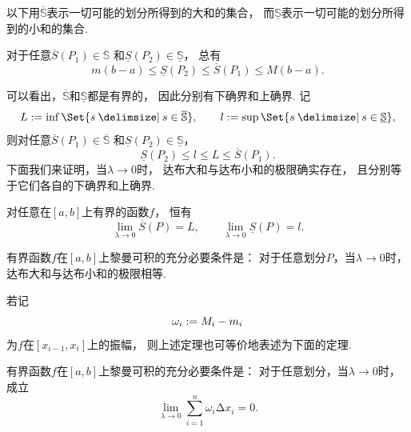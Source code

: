 以下用\(\overline{\mathbb{S}}\)表示一切可能的划分所得到的大和的集合，
而\(\underline{\mathbb{S}}\)表示一切可能的划分所得到的小和的集合.
\begin{lemma}
对于任意\(\overline{S}(P_1) \in \overline{\mathbb{S}}\)
和\(\underline{S}(P_2) \in \underline{\mathbb{S}}\)，
总有\begin{equation*}
	m(b-a)
	\leq \underline{S}(P_2)
	\leq \overline{S}(P_1)
	\leq M(b-a).
\end{equation*}
\end{lemma}
可以看出，\(\overline{\mathbb{S}}\)和\(\underline{\mathbb{S}}\)都是有界的，
因此分别有下确界和上确界.
记\begin{equation*}
	L \defeq \inf\Set{ s \given s \in \overline{\mathbb{S}} }, \qquad
	l \defeq \sup\Set{ s \given s \in \underline{\mathbb{S}} },
\end{equation*}
则对任意\(\overline{S}(P_1) \in \overline{\mathbb{S}}\)
和\(\underline{S}(P_2) \in \underline{\mathbb{S}}\)，\begin{equation*}
	\underline{S}(P_2)
	\leq l \leq L
	\leq \overline{S}(P_1).
\end{equation*}
下面我们来证明，当\(\lambda\to0\)时，
达布大和与达布小和的极限确实存在，
且分别等于它们各自的下确界和上确界.
\begin{lemma}
对任意在\([a,b]\)上有界的函数\(f\)，
恒有\begin{equation*}
	\lim_{\lambda\to0} \overline{S}(P) = L, \qquad
	\lim_{\lambda\to0} \underline{S}(P) = l.
\end{equation*}
\end{lemma}

\begin{theorem}
有界函数\(f\)在\([a,b]\)上黎曼可积的充分必要条件是：
对于任意划分\(P\)，当\(\lambda\to0\)时，
达布大和与达布小和的极限相等.
\end{theorem}

若记\begin{equation*}
	\omega_i := M_i - m_i
\end{equation*}为\(f\)在\([x_{i-1},x_i]\)上的振幅，
则上述定理也可等价地表述为下面的定理.

\begin{theorem}
有界函数\(f\)在\([a,b]\)上黎曼可积的充分必要条件是：
对于任意划分，当\(\lambda\to0\)时，
成立\begin{equation*}
	\lim_{\lambda\to0} \sum_{i=1}^n \omega_i \increment x_i = 0.
\end{equation*}
\end{theorem}

